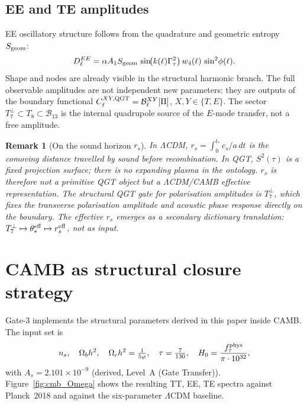 \documentclass[twocolumn,10pt]{article}
\newcommand{\vp}{\varphi}
\newcommand{\Gt}{\Gamma_\tau}
\newcommand{\Sgeom}{S_{\rm geom}}
\newtheorem{remark}[theorem]{Remark}
\begin{document}
\subsection{EE and TE amplitudes}

EE oscillatory structure follows from the quadrature and geometric
entropy $\Sgeom$:
\begin{equation}
  D_\ell^{EE}=\alpha A_1\Sgeom\,
  \sin\!\bigl(k(\ell)\Gt^2\bigr)\,w_4(\ell)\,\sin^2\!\phi(\ell).
  \label{eq:DEE}
\end{equation}
Shape and nodes are already visible in the structural harmonic branch.
The full observable amplitudes are not independent new parameters:
they are outputs of the boundary functional
$C_\ell^{XY,{\rm QGT}}=\mathcal{B}_\ell^{XY}[\Pi]$,
$X,Y\in\{T,E\}$.
The sector $T_7^\perp\subset T_8\subset\mathcal{B}_{13}$ is the
internal quadrupole source of the $E$-mode transfer, not a free amplitude.

\begin{remark}[On the sound horizon $r_s$]
In $\Lambda$CDM, $r_s=\int_0^{t_*}c_s/a\,dt$ is the comoving distance
travelled by sound before recombination. In QGT, $S^2(\tau)$ is a fixed
projection surface; there is no expanding plasma in the ontology.
$r_s$ is therefore not a primitive QGT object but a $\Lambda$CDM/CAMB
effective representation. The structural QGT gate for polarisation
amplitudes is $T_7^\perp$, which fixes the transverse polarisation
amplitude and acoustic phase response directly on the boundary.
The effective $r_s$ emerges as a secondary dictionary translation:
$T_7^\perp\mapsto\theta_*^{\rm eff}\mapsto r_s^{\rm eff}$, not as input.
\end{remark}

\section{CAMB as structural closure strategy}
\label{sec:CAMB}

Gate-3 implements the structural parameters derived in this paper
inside CAMB. The input set is
\begin{equation*}
  n_s,\quad \Omega_bh^2,\quad \Omega_ch^2=\tfrac{1}{5\vp},
  \quad \tau=\tfrac{7}{130},\quad
  H_0=\frac{f_\tau^{\rm phys}}{\pi\cdot 10^{32}},
\end{equation*}
with $A_s=2.101\times10^{-9}$ (derived, Level~A (Gate Transfer)).
Figure~\ref{fig:cmb_Omega} shows the resulting
TT, EE, TE spectra against Planck~2018 and against the
six-parameter $\Lambda$CDM baseline.
\end{document}
